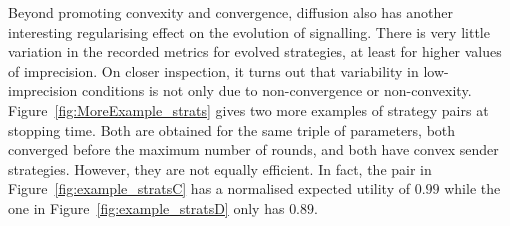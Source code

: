 \documentclass[11pt,english]{article}
\numberwithin{equation}{section}
\begin{document}
Beyond promoting convexity and convergence, diffusion also has another interesting regularising
effect on the evolution of signalling. There is very little variation in the recorded metrics
for evolved strategies, at least for higher values of imprecision. On closer inspection, it
turns out that variability in low-imprecision conditions is not only due to non-convergence or
non-convexity. Figure~\ref{fig:MoreExample_strats} gives two more examples of strategy pairs at
stopping time. Both are obtained for the same triple of parameters, both converged before the
maximum number of rounds, and both have convex sender strategies. However, they are not equally
efficient. In fact, the pair in Figure~\ref{fig:example_stratsC} has a normalised expected
utility of $0.99$ while the one in Figure~\ref{fig:example_stratsD} only has $0.89$.
\end{document}
